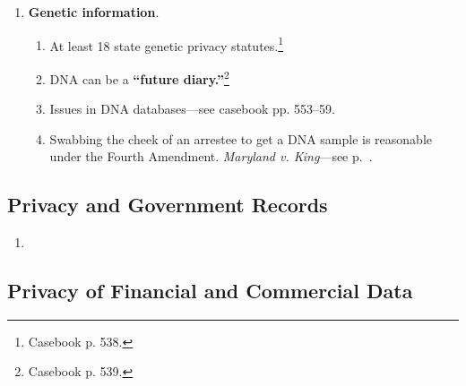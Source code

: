 \begin{enumerate}
    \begin{enumerate}
        \item There are two types of privacy interests: \textbf{informational} 
        and \textbf{decisional}. \emph{Whalen v. Roe}.
        \item \textbf{Constitutional torts}: 42 U.S.C. \S\ 1983 provides civil 
        remedies for constitutional violations. Constitutional violations 
        become tort actions, enabling plaintiffs to win damages and injunctive 
        relief.\footnote{Casebook p. 510--11.} There must be a \textbf{state 
        actor}. Plaintiffs \emph{cannot} directly sue states because of the 
        Eleventh Amendment, but they \emph{can} sue any state or local 
        government official. They can also sue local governments when their 
        policy or custom inflicts the injury.\footnote{Casebook p. 510--11.}
        \item Hospital chaplains can't have open access to patient records, 
        but they can know the patient's ``basic problem.'' \emph{Carter v. 
        BMC}.
        \item To disclose a person's HIV status, the state must show a 
        compelling government interest that outweighs the substantial privacy 
        interest. \emph{Doe v. Borough of Barrington}.
        \item The seven \emph{Westinhouse} factors weight the privacy interest 
        against competing interests. \footnote{Casebook p. 520.} Interest like 
        containing healthcare costs can outweigh individual privacy interests. 
        \emph{Doe v. SEPTA}.
    \end{enumerate}
    \item \textbf{Genetic information}.
    \begin{enumerate}
        \item At least 18 state genetic privacy statutes.\footnote{Casebook p. 
        538.}
        \item DNA can be a \textbf{``future diary.''}\footnote{Casebook p. 
        539.}
        \item Issues in DNA databases---see casebook pp. 553--59.
        \item Swabbing the cheek of an arrestee to get a DNA sample is 
        reasonable under the Fourth Amendment. \emph{Maryland v. King}---see 
        p.~\pageref{sub:maryland-v-king}.
    \end{enumerate}
\end{enumerate}

\newpage

\subsection{Privacy and Government Records}

\begin{enumerate}
    \item %
\end{enumerate}

\newpage

\subsection{Privacy of Financial and Commercial Data}

